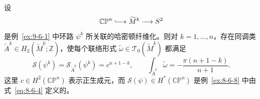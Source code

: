 \begin{proposition}\label{prop:9-6-4}
设
\[
  \mathbb{CP}^n\lhook\joinrel\longrightarrow
  \widetilde M^k\longrightarrow S^2
\]
是例~\ref{ex:9-6-1} 中环路 $\psi^k$ 所关联的哈密顿纤维化。则对
$k=1,\ldots,n$，存在同调类
$\widetilde A^k\in H_2(\widetilde M^k;\mathbb Z)$，使每个联络形式
$\widetilde\omega\in\mathcal T_0(\widetilde M^k)$ 都满足
\begin{equation}\label{eq:9-6-2}
  \mathcal S(\psi^k)=\mathcal S_{\widetilde A^k}(\psi^k)=c^{n+1-k},
  \qquad
  \int_{\widetilde A^k}\widetilde\omega
  =-\frac{\pi(n+1-k)}{n+1}.
\end{equation}
这里 $c\in H^2(\mathbb{CP}^n)$ 表示正生成元，而
$\mathcal S(\psi)\in H^*(\mathbb{CP}^n)$ 是例~\ref{ex:8-6-8} 中由式~\eqref{eq:8-6-4}
定义的。
\end{proposition}

